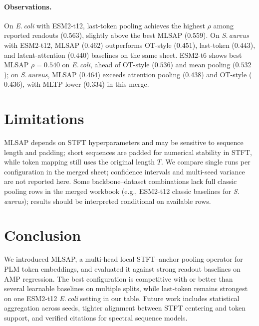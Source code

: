 \documentclass[11pt]{article}
\newcommand{\method}{MLSAP}
\begin{document}


\paragraph{Observations.}
On \textit{E.\,coli} with ESM2-t12, last-token pooling achieves the highest $\rho$ among reported readouts ($0.563$), slightly above the best \method{} ($0.559$).
On \textit{S.\,aureus} with ESM2-t12, \method{} ($0.462$) outperforms OT-style ($0.451$), last-token ($0.443$), and latent-attention ($0.440$) baselines on the same sheet.
ESM2-t6 shows best \method{} $\rho=0.540$ on \textit{E.\,coli}, ahead of OT-style ($0.536$) and mean pooling ($0.532$); on \textit{S.\,aureus}, \method{} ($0.464$) exceeds attention pooling ($0.438$) and OT-style ($0.436$), with MLTP lower ($0.334$) in this merge.

\section{Limitations}
\method{} depends on STFT hyperparameters and may be sensitive to sequence length and padding; short sequences are padded for numerical stability in STFT, while token mapping still uses the original length $T$.
We compare single runs per configuration in the merged sheet; confidence intervals and multi-seed variance are not reported here.
Some backbone--dataset combinations lack full classic pooling rows in the merged workbook (e.g., ESM2-t12 classic baselines for \textit{S.\,aureus}); results should be interpreted conditional on available rows.

\section{Conclusion}
We introduced \method{}, a multi-head local STFT--anchor pooling operator for PLM token embeddings, and evaluated it against strong readout baselines on AMP regression.
The best configuration is competitive with or better than several learnable baselines on multiple splits, while last-token remains strongest on one ESM2-t12 \textit{E.\,coli} setting in our table.
Future work includes statistical aggregation across seeds, tighter alignment between STFT centering and token support, and verified citations for spectral sequence models.



\end{document}
